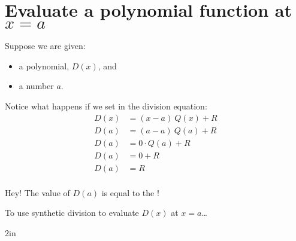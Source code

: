 \section{Evaluate a polynomial function at $x=a$}

Suppose we are given:
\begin{itemize}
    \item a polynomial, $D(x)$, and 
    \item a number $a$.
\end{itemize}
Notice what happens if we set  in the division equation:
\begin{align*}
    D(x) &= (x-a)\:Q(x)  +  R \\
    D(a) &= (a-a)\:Q(a)  +  R \\
    D(a) &= 0\cdot Q(a) +  R \\
    D(a) &= 0  +  R \\
    D(a) &= R \\
\end{align*}

Hey! The value of $D(a)$ is equal to the !

\begin{myConceptSteps}{To use synthetic division to evaluate $D(x)$ at $x=a$\dots}
\end{myConceptSteps}

 
{2in}
